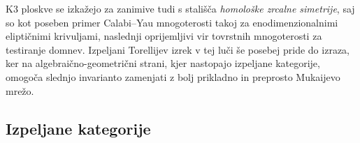 %
%

K3 ploskve se izkažejo za zanimive tudi s stališča \emph{homološke zrcalne simetrije}, saj so kot poseben primer Calabi--Yau mnogoterosti takoj za enodimenzionalnimi eliptičnimi krivuljami, naslednji oprijemljivi vir tovrstnih mnogoterosti za testiranje domnev. Izpeljani Torellijev izrek v tej luči še posebej pride do izraza, ker na algebraično-geometrični strani, kjer nastopajo izpeljane kategorije, omogoča slednjo invarianto zamenjati z bolj prikladno in preprosto Mukaijevo mrežo.  

\subsection*{Izpeljane kategorije}

